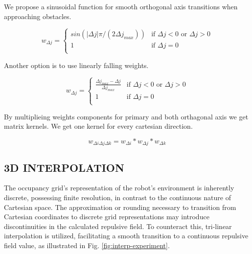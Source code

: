 \documentclass[letterpaper, 10 pt, conference]{ieeeconf}  %
\begin{document}
We propose a sinusoidal function for smooth orthogonal axis transitions when approaching obstacles.

\begin{equation}
	w_{\Delta j} =
	\begin{cases} 
		sin(\left| \Delta j \right| \pi / (2 \Delta j_{max})) & \text{if } \Delta j < 0 \text{~or }  \Delta j > 0 \\
		1 & \text{if } \Delta j = 0 \\
	\end{cases}
\end{equation}

Another option is to use linearly falling weights.

\begin{equation}
	w_{\Delta j} =
	\begin{cases} 
		\frac{\Delta j_{max} - \Delta j }{\Delta j_{max}} & \text{if } \Delta j < 0 \text{~or }  \Delta j > 0 \\
		1 & \text{if } \Delta j = 0 \\
	\end{cases}
\end{equation}


By multiplieing weights components for primary and both orthagonal axis we get matrix kernels. We get one kernel for every cartesian direction.

\begin{equation}
	w_{\Delta i \Delta j \Delta k} = w_{\Delta i} * w_{\Delta j} * w_{\Delta k}
\end{equation}

\subsection{3D INTERPOLATION} 

The occupancy grid's representation of the robot's environment is inherently discrete, possessing finite resolution, in contrast to the continuous nature of Cartesian space. The approximation or rounding necessary to transition from Cartesian coordinates to discrete grid representations may introduce discontinuities in the calculated repulsive field. To counteract this, tri-linear interpolation is utilized, facilitating a smooth transition to a continuous repulsive field value, as illustrated in Fig. \ref{fig:interp-experiment}.

\end{document}
